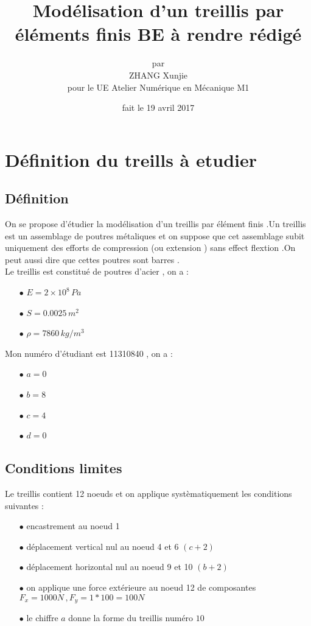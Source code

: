 \documentclass[a4paper,10pt]{report} %
\title{\textbf{Modélisation d'un treillis par éléments finis BE à rendre rédigé}} %
\author{par\\ZHANG Xunjie\\pour le UE Atelier Numérique en Mécanique M1 } %
\date{fait le 19 avril 2017} %
\begin{document}
\maketitle %
\tableofcontents %
\listoffigures %






\chapter{Définition du treills à etudier}
\section{Définition}
On se propose d'étudier la modélisation d'un treillis par élément finis .Un treillis est un assemblage de poutres métaliques et on suppose que cet assemblage subit uniquement des efforts de compression (ou extension ) sans effect flextion .On peut aussi dire que cettes poutres sont barres . \\

Le treillis est constitué de poutres d'acier , on a :
\begin{itemize}
    \item[$\bullet$]$E=2\times 10^8\,Pa$
    \item[$\bullet$]$S=0.0025\,m^2$
    \item[$\bullet$]$\rho=7860\,kg/m^3$
\end{itemize}

Mon numéro d'étudiant est 11310840 , on a :
\begin{itemize}
    \item[$\bullet$]$a=0$
    \item[$\bullet$]$b=8$
    \item[$\bullet$]$c=4$
    \item[$\bullet$]$d=0$
\end{itemize}

\section{Conditions limites}
Le treillis contient 12 noeuds et on applique systèmatiquement les conditions suivantes :
\begin{itemize}
    \item[$\bullet$]encastrement au noeud 1
    \item[$\bullet$]déplacement vertical nul au noeud 4 et 6 $(c+2)$
    \item[$\bullet$]déplacement horizontal nul au noeud 9 et 10 $(b+2)$
    \item[$\bullet$]on applique une force extérieure au noeud 12 de composantes $F_x=1000N\,,F_y=1*100=100N$
     \item[$\bullet$] le chiffre $a$ donne la forme du treillis numéro $10$
\end{itemize}
\end{document}
